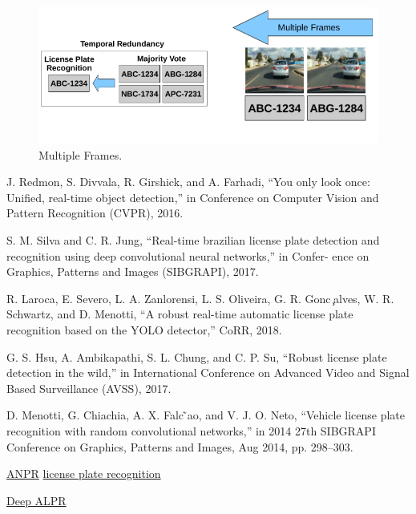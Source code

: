 \documentclass[letterpaper,12pt]{article}
\begin{document}
\begin{figure}
	\centering
	\begin{minipage}[b]{.4\textwidth}
		\centering \includegraphics[width=0.8\columnwidth]{maj.png}
		
		\caption{
			\label{fig:13} %
			Multiple Frames.
		}
		
	\end{minipage}
\end{figure}



\begin{thebibliography}{}
	
\bibitem{}	
J. Redmon, S. Divvala, R. Girshick, and A. Farhadi, “You only look
once: Unified, real-time object detection,” in Conference on Computer
Vision and Pattern Recognition (CVPR), 2016.

\bibitem{}
S. M. Silva and C. R. Jung, “Real-time brazilian license plate detection
and recognition using deep convolutional neural networks,” in Confer-
ence on Graphics, Patterns and Images (SIBGRAPI), 2017.

\bibitem{}
R. Laroca, E. Severo, L. A. Zanlorensi, L. S. Oliveira, G. R. Gonc ̧alves,
W. R. Schwartz, and D. Menotti, “A robust real-time automatic license
plate recognition based on the YOLO detector,” CoRR, 2018.

\bibitem{}
G. S. Hsu, A. Ambikapathi, S. L. Chung, and C. P. Su, “Robust license
plate detection in the wild,” in International Conference on Advanced
Video and Signal Based Surveillance (AVSS), 2017.


\bibitem{}
D. Menotti, G. Chiachia, A. X. Falc ̃ao, and V. J. O. Neto, “Vehicle
license plate recognition with random convolutional networks,” in 2014
27th SIBGRAPI Conference on Graphics, Patterns and Images, Aug
2014, pp. 298–303.

\bibitem{}
\href{http://www.anpr.net/}{ANPR}
\bibitem{}
\href{http://www.licenseplaterecognition.com/}{license plate recognition}

\bibitem{}
\href{https://matthewearl.github.io/2016/05/06/cnn-anpr/}{Deep ALPR}
 


\end{thebibliography}
\end{document}
